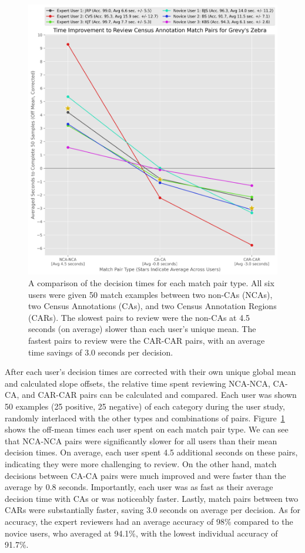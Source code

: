 \begin{figure}[!t]
    \begin{center}
        \includegraphics[width=0.70\linewidth]{resources/improvement.pdf}
    \end{center}
    \caption{A comparison of the decision times for each match pair type.  All six users were given 50 match examples between two non-CAs (NCAs), two Census Annotations (CAs), and two Census Annotation Regions (CARs).  The slowest pairs to review were the non-CAs at 4.5 seconds (on average) slower than each user's unique mean.  The fastest pairs to review were the CAR-CAR pairs, with an average time savings of 3.0 seconds per decision.}
    \label{fig:user-study-improvement}
\end{figure}

After each user's decision times are corrected with their own unique global mean and calculated slope offsets, the relative time spent reviewing NCA-NCA, CA-CA, and CAR-CAR pairs can be calculated and compared.  Each user was shown 50 examples (25 positive, 25 negative) of each category during the user study, randomly interlaced with the other types and combinations of pairs.  Figure~\ref{fig:user-study-improvement} shows the off-mean times each user spent on each match pair type.  We can see that NCA-NCA pairs were significantly slower for all users than their mean decision times.  On average, each user spent 4.5 additional seconds on these pairs, indicating they were more challenging to review. On the other hand, match decisions between CA-CA pairs were much improved and were faster than the average by 0.8 seconds.  Importantly, each user was as fast as their average decision time with CAs or was noticeably faster.  Lastly, match pairs between two CARs were substantially faster, saving 3.0 seconds on average per decision.  As for accuracy, the expert reviewers had an average accuracy of 98\% compared to the novice users, who averaged at 94.1\%, with the lowest individual accuracy of 91.7\%.

